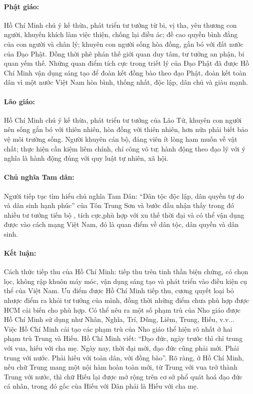 \paragraph{Phật giáo:}
Hồ Chí Minh chú ý kế thừa, phát triển tư tưởng từ bi, vị tha, yêu thương con người, khuyến khích làm việc thiện, chống lại điều ác; đề cao quyền bình đẳng của con người và chân lý; khuyên con người sống hòa đồng, gắn bó với đất nước của Đạo Phật. Đồng thời phê phán thế giới quan duy tâm, tư tưởng an phận, bi quan yếm thế. Những quan điểm tích cực trong triết lý của Đạo Phật đã được Hồ Chí Minh vận dụng sáng tạo để đoàn kết đồng bào theo đạo Phật, đoàn kết toàn dân vì một nước Việt Nam hòa bình, thống nhất, độc lập, dân chủ và giàu mạnh.

\paragraph{Lão giáo:}
Hồ Chí Minh chú ý kế thừa, phát triển tư tưởng của Lão Tử, khuyên con người nên sống gắn bó với thiên nhiên, hòa đồng với thiên nhiên, hơn nữa phải biết bảo vệ môi trường sống. Người khuyên cán bộ, đảng viên ít lòng ham muốn về vật chất; thực hiện cần kiệm liêm chính, chí công vô tư; hành động theo đạo lý với ý nghĩa là hành động đúng với quy luật tự nhiên, xã hội.

\paragraph{Chủ nghĩa Tam dân:}
Người tiếp tục tìm hiểu chủ nghĩa Tam Dân: ``Dân tộc độc lập, dân quyền tự do và dân sinh hạnh phúc'' của Tôn Trung Sơn và bước đầu nhận thấy trong đó nhiều tư tưởng tiến bộ , tích cực,phù hợp với xu thế thời đại và có thể vận dụng được vào cách mạng Việt Nam, đó là quan điểm về dân tộc, dân quyền và dân sinh.

\paragraph{Kết luận:}
Cách thức tiếp thu của Hồ Chí Minh: tiếp thu trên tinh thần biện chứng, có chọn lọc, không rập khuôn máy móc, vận dụng sáng tạo và phát triển vào điều kiện cụ thể của Việt Nam. Ưu điểm được Hồ Chí Minh tiếp thu, cương quyết loại bỏ nhược điểm ra khỏi tư tưởng của mình, đồng thời những điểm chưa phù hợp được HCM cải biến cho phù hợp. Có thể nêu ra một số phạm trù của Nho giáo được Hồ Chí Minh sử dụng như Nhân, Nghĩa, Trí, Dũng, Liêm, Trung, Hiếu, v.v... Việc Hồ Chí Minh cải tạo các phạm trù của Nho giáo thể hiện rõ nhất ở hai phạm trù Trung và Hiếu. Hồ Chí Minh viết: ``Đạo đức, ngày trước thì chỉ trung với vua, hiếu với cha mẹ. Ngày nay, thời đại mới, đạo đức cũng phải mới. Phải trung với nước. Phải hiếu với toàn dân, với đồng bào''. Rõ ràng, ở Hồ Chí Minh, nếu chữ Trung mang một nội hàm hoàn toàn mới, từ Trung với vua trở thành Trung với nước, thì chữ Hiếu lại được mở rộng trên cơ sở phổ quát hoá đạo đức cá nhân, trong đó gốc của Hiếu với Dân phải là Hiếu với cha mẹ.

